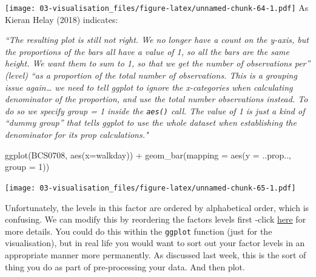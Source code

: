 \documentclass[
]{book}
\newenvironment{Shaded}{\begin{snugshade}}{\end{snugshade}}
\newcommand{\AttributeTok}[1]{\textcolor[rgb]{0.77,0.63,0.00}{#1}}
\newcommand{\CommentTok}[1]{\textcolor[rgb]{0.56,0.35,0.01}{\textit{#1}}}
\newcommand{\DecValTok}[1]{\textcolor[rgb]{0.00,0.00,0.81}{#1}}
\newcommand{\FunctionTok}[1]{\textcolor[rgb]{0.00,0.00,0.00}{#1}}
\newcommand{\NormalTok}[1]{#1}
\newcommand{\SpecialCharTok}[1]{\textcolor[rgb]{0.00,0.00,0.00}{#1}}
\begin{document}
\texttt{[image: 03-visualisation\_files/figure-latex/unnamed-chunk-64-1.pdf]}
As Kieran Helay (2018) indicates:

\emph{``The resulting plot is still not right. We no longer have a count on the y-axis, but the proportions of the bars all have a value of 1, so all the bars are the same height. We want them to sum to 1, so that we get the number of observations per'' (level) ``as a proportion of the total number of observations. This is a grouping issue again\ldots{} we need to tell ggplot to ignore the x-categories when calculating denominator of the proportion, and use the total number observations instead. To do so we specify group = 1 inside the \texttt{aes()} call. The value of 1 is just a kind of ``dummy group'' that tells ggplot to use the whole dataset when establishing the denominator for its prop calculations."}

\begin{Shaded}
\begin{Highlighting}[]
\FunctionTok{ggplot}\NormalTok{(BCS0708, }\FunctionTok{aes}\NormalTok{(}\AttributeTok{x=}\NormalTok{walkday)) }\SpecialCharTok{+}
  \FunctionTok{geom\_bar}\NormalTok{(}\AttributeTok{mapping =} \FunctionTok{aes}\NormalTok{(}\AttributeTok{y =}\NormalTok{ ..prop.., }\AttributeTok{group =} \DecValTok{1}\NormalTok{))}
\end{Highlighting}
\end{Shaded}

\texttt{[image: 03-visualisation\_files/figure-latex/unnamed-chunk-65-1.pdf]}

Unfortunately, the levels in this factor are ordered by alphabetical order, which is confusing. We can modify this by reordering the factors levels first -click \href{http://www.cookbook-r.com/Manipulating_data/Changing_the_order_of_levels_of_a_factor/}{here} for more details. You could do this within the \texttt{ggplot} function (just for the visualisation), but in real life you would want to sort out your factor levels in an appropriate manner more permanently. As discussed last week, this is the sort of thing you do as part of pre-processing your data. And then plot.

\begin{Shaded}
\end{Shaded}
\end{document}
